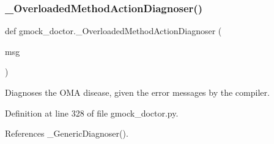 \subsubsection{\texorpdfstring{\+\_\+\+Overloaded\+Method\+Action\+Diagnoser()}{\_OverloadedMethodActionDiagnoser()}}
{\footnotesize\ttfamily def gmock\+\_\+doctor.\+\_\+\+Overloaded\+Method\+Action\+Diagnoser (\begin{DoxyParamCaption}\item[{}]{msg }\end{DoxyParamCaption})\hspace{0.3cm}{\ttfamily [private]}}

\begin{DoxyVerb}Diagnoses the OMA disease, given the error messages by the compiler.\end{DoxyVerb}
 

Definition at line 328 of file gmock\+\_\+doctor.\+py.



References \+\_\+\+Generic\+Diagnoser().


